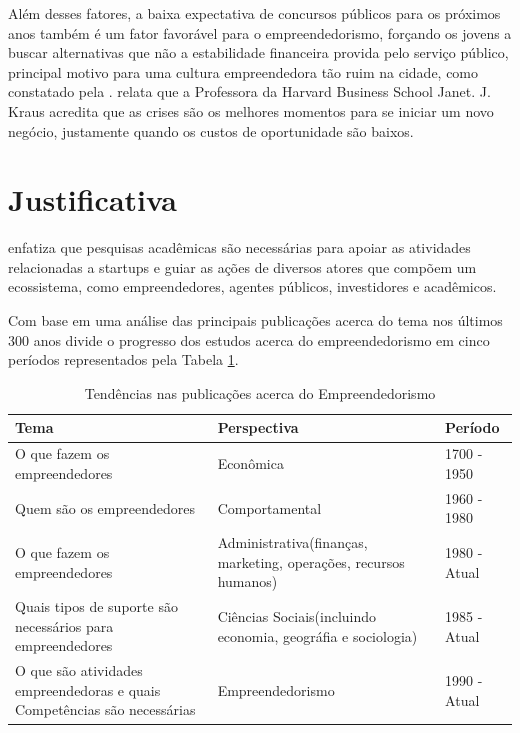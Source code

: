 Além desses fatores, a baixa expectativa de concursos públicos para os próximos anos também é um fator favorável para o empreendedorismo, forçando os jovens a buscar alternativas que não a estabilidade financeira provida pelo serviço público, principal motivo para uma cultura empreendedora tão ruim na cidade, como constatado pela .  relata que a Professora da Harvard Business School Janet. J. Kraus acredita que as crises são os melhores momentos para se iniciar um novo negócio, justamente quando os custos de oportunidade são baixos. 

\section{Justificativa}
\label{section:justificativa}

 enfatiza que pesquisas acadêmicas são necessárias para apoiar as atividades relacionadas a startups e guiar as ações de diversos atores que compõem um ecossistema, como empreendedores, agentes públicos, investidores e acadêmicos.

Com base em uma análise das principais publicações acerca do tema nos últimos 300 anos  divide o progresso dos estudos acerca do empreendedorismo em cinco períodos representados pela Tabela \ref{table:tendencias_nas_publicacoes_acerca_do_empreendedorismo}.

\begin{table}[!htb]
	\centering
	\begin{tabular}{ | p{6cm} | p{6cm} | p{3cm} | }
		\hline
		Tema & Perspectiva & Período \\ \hline
		O que fazem os empreendedores & Econômica & 1700 - 1950 \\ \hline
		Quem são os empreendedores & Comportamental & 1960 - 1980 \\ \hline
		O que fazem os empreendedores & Administrativa(finanças, marketing, operações, recursos humanos) & 1980 - Atual \\ \hline
		Quais tipos de suporte são necessários para empreendedores & Ciências Sociais(incluindo economia, geográfia e sociologia) & 1985 - Atual \\ \hline
		O que são atividades empreendedoras e quais Competências são necessárias & Empreendedorismo & 1990 - Atual \\ \hline
	\end{tabular}
	\caption{Tendências nas publicações acerca do Empreendedorismo}
	\label{table:tendencias_nas_publicacoes_acerca_do_empreendedorismo}
\end{table}

